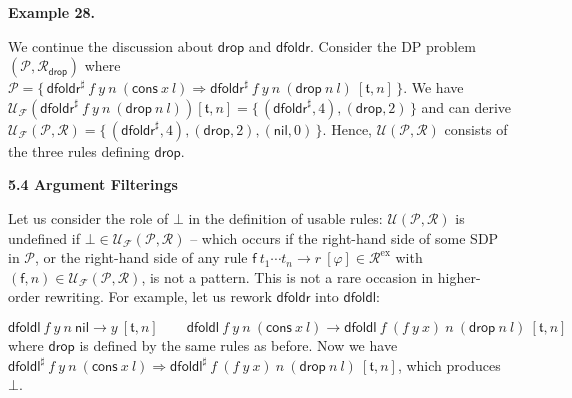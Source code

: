 \documentclass[10pt,a4paper]{amsart}
\begin{document}
 
 
\par\medskip\noindent\textbf{Example 28.}\par
 
 
We continue the discussion about $\mathsf{drop}$ and $\mathsf{dfoldr}$. Consider the DP problem $(\mathcal{P},\mathcal{R}_{\mathsf{drop}})$ where $\mathcal{P}=\{\,{{{{{\mathsf{dfoldr}^{\sharp}}\ {f}}\ {y}}\ {n}}\ {({{\mathsf{cons}}\ {x}}\ {l})}}\Rightarrow{{{{{\mathsf{dfoldr}^{\sharp}}\ {f}}\ {y}}\ {n}}\ {({{\mathsf{drop}}\ {n}}\ {l})}}\ [\mathfrak{t},n]\,\}$. We have $\mathcal{U}_{\mathcal{F}}({{{{\mathsf{dfoldr}^{\sharp}}\ {f}}\ {y}}\ {n}}\ {({{\mathsf{drop}}\ {n}}\ {l})})[\mathfrak{t},n]=\{\,(\mathsf{dfoldr}^{\sharp},4),(\mathsf{drop},2)\,\}$ and can derive $\mathcal{U}_{\mathcal{F}}(\mathcal{P},\mathcal{R})=\{\,(\mathsf{dfoldr}^{\sharp},4),(\mathsf{drop},2),(\mathsf{nil},0)\,\}$. Hence, $\mathcal{U}(\mathcal{P},\mathcal{R})$ consists of the three rules defining $\mathsf{drop}$.\par
 
 
 
 
 
\par\medskip\noindent\textbf{5.4 Argument Filterings}\par
 
 
Let us consider the role of $\bot$ in the definition of usable rules: $\mathcal{U}(\mathcal{P},\mathcal{R})$ is undefined if $\bot\in\mathcal{U}_{\mathcal{F}}(\mathcal{P},\mathcal{R})$ – which occurs if the right-hand side of some SDP in $\mathcal{P}$, or the right-hand side of any rule ${{\mathsf{f}}\ {{t}_{1}\cdots{t}_{n}}}\rightarrow{r}\ [\varphi]\in\mathcal{R}^{\mathrm{ex}}$ with $(\mathsf{f},n)\in\mathcal{U}_{\mathcal{F}}(\mathcal{P},\mathcal{R})$, is not a pattern. This is not a rare occasion in higher-order rewriting. For example, let us rework $\mathsf{dfoldr}$ into $\mathsf{dfoldl}$:\par
    \[{{{{\mathsf{dfoldl}}\ {f}}\ {y}}\ {n}}\ {\mathsf{nil}}\rightarrow y\ [\mathfrak{t},n]\quad\quad{{{{\mathsf{dfoldl}}\ {f}}\ {y}}\ {n}}\ {({{\mathsf{cons}}\ {x}}\ {l})}\rightarrow{{{{\mathsf{dfoldl}}\ {f}}\ {({{f}\ {y}}\ {x})}}\ {n}}\ {({{\mathsf{drop}}\ {n}}\ {l})}\ [\mathfrak{t},n]\]    
where $\mathsf{drop}$ is defined by the same rules as before. Now we have ${{{{{\mathsf{dfoldl}^{\sharp}}\ {f}}\ {y}}\ {n}}\ {({{\mathsf{cons}}\ {x}}\ {l})}}\Rightarrow{{{{{\mathsf{dfoldl}^{\sharp}}\ {f}}\ {({{f}\ {y}}\ {x})}}\ {n}}\ {({{\mathsf{drop}}\ {n}}\ {l})}}\ [\mathfrak{t},n]$, which produces $\bot$.\par
 
\end{document}

